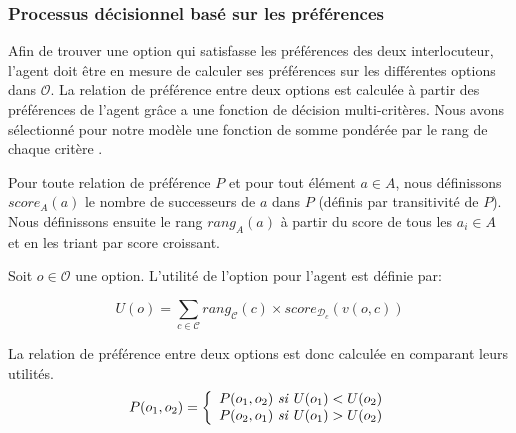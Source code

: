 \documentclass [french]{sig-alternate-05-2015}
\begin{document}


%
%

\subsubsection{Processus décisionnel basé sur les préférences}
Afin de trouver une option qui satisfasse les préférences des deux interlocuteur, l'agent doit être en mesure de calculer ses préférences sur les différentes options dans $\mathcal{O}$. La relation de préférence entre deux options est calculée à partir des préférences de l'agent grâce a une fonction de décision multi-critères. Nous avons sélectionné pour notre modèle une fonction de somme pondérée par le rang de chaque critère \cite{yager2012ordered}.

Pour toute relation de préférence $P$ et pour tout élément $a\in A$, nous définissons $score_A(a)$ le nombre de successeurs de $a$ dans $P$ (définis par transitivité de $P$). Nous définissons ensuite le rang $rang_A(a)$ à partir du score de tous les $a_i\in A$ et en les triant par score croissant.

Soit $o\in \mathcal{O}$ une option. L'utilité de l'option pour l'agent est définie par:

\[U(o) = \sum_{c \in \mathcal{C}}  rang_{\mathcal{C}}(c) \times score_{\mathcal{D}_c}\left( v(o, c) \right) \] 


\par La relation de préférence entre deux options est donc calculée en comparant leurs utilités. 
\[ P(o_1, o_2)  = \left \{
\begin{array}{l}
P(o_1, o_2)$ \textit{si} $U(o_1) < U(o_2) \\
P(o_2, o_1)$ \textit{si} $U(o_1) > U(o_2) 
\end{array}
\right .\]
\end{document}
